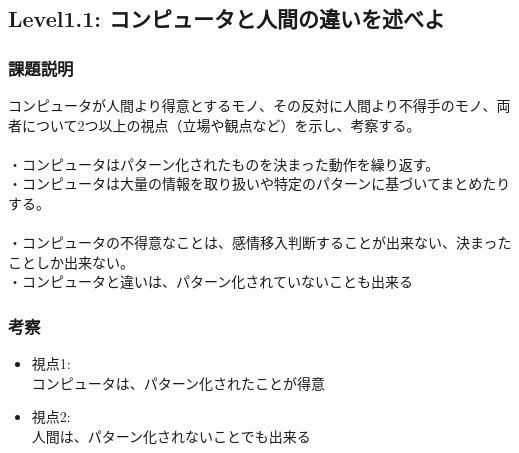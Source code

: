 \subsection{Level1.1: コンピュータと人間の違いを述べよ}
\subsubsection{課題説明}
コンピュータが人間より得意とするモノ、その反対に人間より不得手のモノ、両者について2つ以上の視点（立場や観点など）を示し、考察する。\\
\\
・コンピュータはパターン化されたものを決まった動作を繰り返す。\\
・コンピュータは大量の情報を取り扱いや特定のパターンに基づいてまとめたりする。\\
\\
・コンピュータの不得意なことは、感情移入判断することが出来ない、決まったことしか出来ない。\\
・コンピュータと違いは、パターン化されていないことも出来る
\subsubsection{考察}
\begin{itemize}
 \item 視点1: \\
コンピュータは、パターン化されたことが得意\\
 \item 視点2: \\
人間は、パターン化されないことでも出来る\\
\end{itemize}

